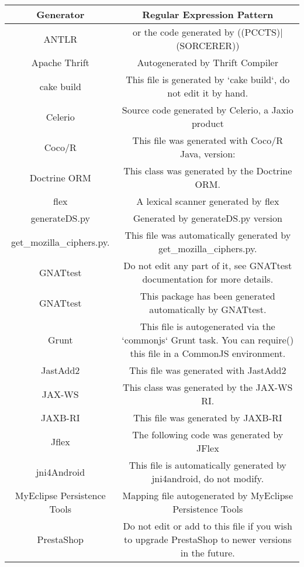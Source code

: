 \setlength{\extrarowheight}{0.2em}
\begin{table}
	\label{table:generatorPatternRepositoryGit}
	\begin{tabularx}{\textwidth}{c|C}
		\textbf{Generator} & \textbf{Regular Expression Pattern} \\
		\hline
		ANTLR & or the code generated by ((PCCTS)|(SORCERER)) \\
		Apache Thrift & Autogenerated by Thrift Compiler \version \\
		cake build & This file is generated by `cake build`, do not edit it by hand. \\
		Celerio & Source code generated by Celerio, a Jaxio product \\
		Coco/R & This file was generated with Coco/R Java, version: \version \\
		Doctrine ORM & This class was generated by the Doctrine ORM. \\
		flex & A lexical scanner generated by flex \\
		generateDS.py & Generated \timestamp by generateDS.py version \version \\
		get\_mozilla\_ciphers.py. & This file was automatically generated by get\_mozilla\_ciphers.py. \\
		GNATtest & Do not edit any part of it, see GNATtest documentation for more details. \\
		GNATtest & This package has been generated automatically by GNATtest. \\
		Grunt & This file is autogenerated via the `commonjs` Grunt task. You can require() this file in a CommonJS environment. \\
		JastAdd2 & This file was generated with JastAdd2 \\
		JAX-WS & This class was generated by the JAX-WS RI. \\
		JAXB-RI & This file was generated by JAXB-RI \version \\
		Jflex & The following code was generated by JFlex \version \\
		jni4Android & This file is automatically generated by jni4android, do not modify. \\
		MyEclipse Persistence Tools & Mapping file autogenerated by MyEclipse Persistence Tools \\
		PrestaShop & Do not edit or add to this file if you wish to upgrade PrestaShop to newer versions in the future. \\

\end{tabularx}
\end{table}
